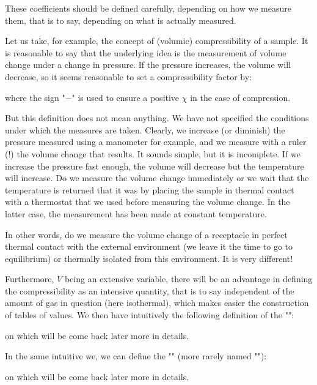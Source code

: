 	These coefficients should be defined carefully, depending on how we measure them, that is to say, depending on what is actually measured.

	Let us take, for example, the concept of (volumic) compressibility of a sample. It is reasonable to say that the underlying idea is the measurement of volume change under a change in pressure. If the pressure increases, the volume will decrease, so it seems reasonable to set a compressibility factor by:
	
	where the sign "$-$" is used to ensure a positive $\chi$ in the case of compression.
	
	But this definition does not mean anything. We have not specified the conditions under which the measures are taken. Clearly, we increase (or diminish) the pressure measured using a manometer for example, and we measure with a ruler (!) the volume change that results. It sounds simple, but it is incomplete. If we increase the pressure fast enough, the volume will decrease but the temperature will increase. Do we measure the volume change immediately or we wait that the temperature is returned that it was by placing the sample in thermal contact with a thermostat that we used before measuring the volume change. In the latter case, the measurement has been made at constant temperature.

	In other words, do we measure the volume change of a receptacle in perfect thermal contact with the external environment (we leave it the time to go to equilibrium) or thermally isolated from this environment. It is very different!

	Furthermore, $V$ being an extensive variable, there will be an advantage in defining the compressibility as an intensive quantity, that is to say independent of the amount of gas in question (here isothermal), which makes easier the construction of tables of values. We then have intuitively the following definition of the "":
	
	on which will be come back later more in details.

	In the same intuitive we, we can define the "" (more rarely named ""):
	
	on which will be come back later more in details.
	
